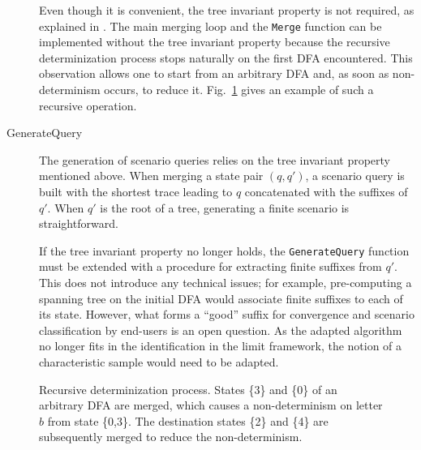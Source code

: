 \begin{description}
Even though it is convenient, the tree invariant property is not required, as explained in \cite{Lambeau:2008}. The main merging loop and the \texttt{Merge} function can be implemented without the tree invariant property because the recursive determinization process stops naturally on the first DFA encountered. This observation allows one to start from an arbitrary DFA and, as soon as non-determinism occurs, to reduce it. Fig.~\ref{figure:merging-for-determ-on-dfa} gives an example of such a recursive operation.

\item[GenerateQuery] The generation of scenario queries relies on the tree invariant property mentioned above. When merging a state pair $(q,q')$, a scenario query is built with the shortest trace leading to $q$ concatenated with the suffixes of $q'$. When $q'$ is the root of a tree, generating a finite scenario is straightforward.

If the tree invariant property no longer holds, the \texttt{GenerateQuery} function must be extended with a procedure for extracting finite suffixes from $q'$. This does not introduce any technical issues; for example, pre-computing a spanning tree on the initial DFA would associate finite suffixes to each of its state. However, what forms a ``good'' suffix for convergence and scenario classification by end-users is an open question. As the adapted algorithm no longer fits in the identification in the limit framework, the notion of a characteristic sample would need to be adapted. 

\end{description}

\begin{figure}\centering
{}
\caption{Recursive determinization process. States \{3\} and \{0\} of an arbitrary DFA are merged, which causes a non-determinism on letter $b$ from state \{0,3\}. The destination states \{2\} and \{4\} are subsequently merged to reduce the non-determinism.\label{figure:merging-for-determ-on-dfa}} 
\end{figure}
  
